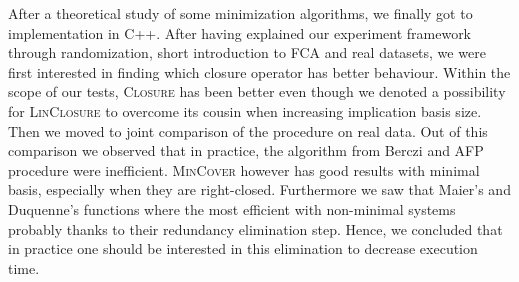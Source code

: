 After a theoretical study of some minimization algorithms, we finally got to implementation in C++. After having explained our experiment framework through
randomization, short introduction to FCA and real datasets, we were first interested in finding which closure operator has better behaviour. Within the scope of our tests, \textsc{Closure} has been better even though we denoted a possibility for \textsc{LinClosure} to overcome its cousin when increasing 
implication basis size. Then we moved to joint comparison of the procedure on
real data. Out of this comparison we observed that in practice, the algorithm
from Berczi and AFP procedure were inefficient. \textsc{MinCover} however has good results with minimal basis, especially when they are right-closed. Furthermore we saw that Maier's and Duquenne's functions where the most efficient with non-minimal systems probably thanks to their redundancy elimination step. Hence, we concluded that in practice one should
be interested in this elimination to decrease execution time.

